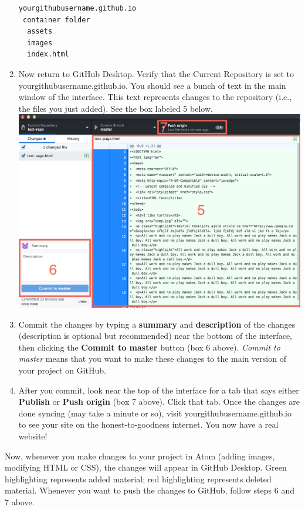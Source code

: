 \documentclass[]{book}
\theoremstyle{definition}
\theoremstyle{definition}
\theoremstyle{definition}
\theoremstyle{remark}
\begin{document}
\begin{enumerate}
\begin{verbatim}
yourgithubusername.github.io  
 container folder  
  assets  
  images  
  index.html
\end{verbatim}
\item
  Now return to GitHub Desktop. Verify that the Current Repository is
  set to yourgithubusername.github.io. You should see a bunch of text in
  the main window of the interface. This text represents changes to the
  repository (i.e., the files you just added). See the box labeled 5
  below.\\
  \includegraphics{github-desktop.png}
\item
  Commit the changes by typing a \textbf{summary} and
  \textbf{description} of the changes (description is optional but
  recommended) near the bottom of the interface, then clicking the
  \textbf{Commit to master} button (box 6 above). \emph{Commit to
  master} means that you want to make these changes to the main version
  of your project on GitHub.
\item
  After you commit, look near the top of the interface for a tab that
  says either \textbf{Publish} or \textbf{Push origin} (box 7 above).
  Click that tab. Once the changes are done syncing (may take a minute
  or so), visit yourgithubusername.github.io to see your site on the
  honest-to-goodness internet. You now have a real website!
\end{enumerate}

Now, whenever you make changes to your project in Atom (adding images,
modifying HTML or CSS), the changes will appear in GitHub Desktop. Green
highlighting represents added material; red highlighting represents
deleted material. Whenever you want to push the changes to GitHub,
follow steps 6 and 7 above.
\end{document}
